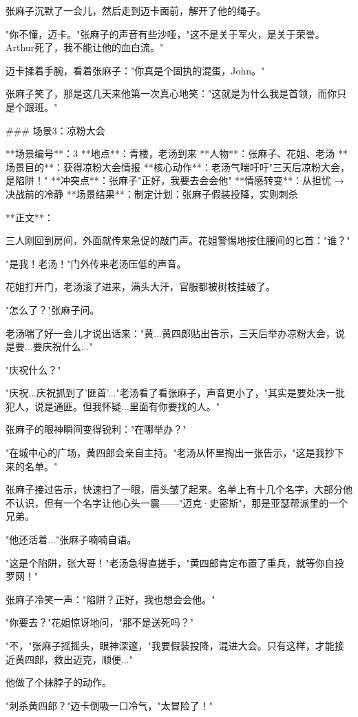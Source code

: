 张麻子沉默了一会儿，然后走到迈卡面前，解开了他的绳子。

"你不懂，迈卡。"张麻子的声音有些沙哑，"这不是关于军火，是关于荣誉。Arthur死了，我不能让他的血白流。"

迈卡揉着手腕，看着张麻子："你真是个固执的混蛋，John。"

张麻子笑了，那是这几天来他第一次真心地笑："这就是为什么我是首领，而你只是个跟班。"

### 场景3：凉粉大会

**场景编号**：3  
**地点**：青楼，老汤到来  
**人物**：张麻子、花姐、老汤  
**场景目的**：获得凉粉大会情报  
**核心动作**：老汤气喘吁吁"三天后凉粉大会，是陷阱！"  
**冲突点**：张麻子"正好，我要去会会他"  
**情感转变**：从担忧 → 决战前的冷静  
**场景结果**：制定计划：张麻子假装投降，实则刺杀

**正文**：

三人刚回到房间，外面就传来急促的敲门声。花姐警惕地按住腰间的匕首："谁？"

"是我！老汤！"门外传来老汤压低的声音。

花姐打开门，老汤滚了进来，满头大汗，官服都被树枝挂破了。

"怎么了？"张麻子问。

老汤喘了好一会儿才说出话来："黄...黄四郎贴出告示，三天后举办凉粉大会，说是要...要庆祝什么..."

"庆祝什么？"

"庆祝...庆祝抓到了'匪首'..."老汤看了看张麻子，声音更小了，"其实是要处决一批犯人，说是通匪。但我怀疑...里面有你要找的人。"

张麻子的眼神瞬间变得锐利："在哪举办？"

"在城中心的广场，黄四郎会亲自主持。"老汤从怀里掏出一张告示，"这是我抄下来的名单。"

张麻子接过告示，快速扫了一眼，眉头皱了起来。名单上有十几个名字，大部分他不认识，但有一个名字让他心头一震——"迈克·史密斯"，那是亚瑟帮派里的一个兄弟。

"他还活着..."张麻子喃喃自语。

"这是个陷阱，张大哥！"老汤急得直搓手，"黄四郎肯定布置了重兵，就等你自投罗网！"

张麻子冷笑一声："陷阱？正好，我也想会会他。"

"你要去？"花姐惊讶地问，"那不是送死吗？"

"不，"张麻子摇摇头，眼神深邃，"我要假装投降，混进大会。只有这样，才能接近黄四郎，救出迈克，顺便..."

他做了个抹脖子的动作。

"刺杀黄四郎？"迈卡倒吸一口冷气，"太冒险了！"

